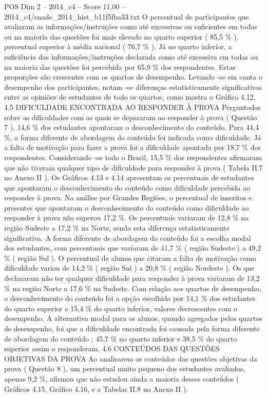 \begin{textsample}{POS Dim 2 – 2014\_c4 – Score 11.00 – 2014\_c4/enade\_2014\_hist\_b11f5fba33.txt}
O percentual de participantes que avaliaram as informações/instruções como até excessivas ou suficientes em todas ou na maioria das questões foi mais elevado no quarto superior ( 85,5 \% ), percentual superior à média nacional ( 76,7 \% ).
Já no quarto inferior, a suficiência das informações/instruções declarada como até excessiva em todas ou na maioria das questões foi percebida por 65,9 \% dos respondentes.
Estas proporções são crescentes com os quartos de desempenho.
Levando -se em conta o desempenho dos participantes, notam -se diferenças estatisticamente significativas entre as opiniões de estudantes de todo os quartos, como mostra o Gráfico 4.12. 4.5 DIFICULDADE ENCONTRADA AO RESPONDER À PROVA Perguntados sobre as dificuldades com as quais se depararam ao responder à prova ( Questão 7 ), 14,6 \% dos estudantes apontaram o desconhecimento do conteúdo.
Para 44,4 \%, a forma diferente de abordagem do conteúdo foi indicada como dificuldade.
Já a falta de motivação para fazer a prova foi a dificuldade apontada por 18,7 \% dos respondentes.
Considerando -se todo o Brasil, 15,5 \% dos respondentes afirmaram que não tiveram qualquer tipo de dificuldade para responder à prova ( Tabela II.7 no Anexo II ).
Os Gráficos 4.13 e 4.14 apresentam os percentuais de estudantes que apontaram o desconhecimento do conteúdo como dificuldade percebida ao responder à prova.
Na análise por Grandes Regiões, o percentual de inscritos e presentes que apontaram o desconhecimento do conteúdo como dificuldade ao responder à prova não superou 17,2 \%.
Os percentuais variaram de 12,8 \% na região Sudeste a 17,2 \% na Norte, sendo esta diferença estatisticamente significativa.
A forma diferente de abordagem do conteúdo foi a escolha modal dos estudantes, com percentuais que variaram de 41,7 \% ( região Sudeste ) a 49,2 \% ( região Sul ).
O percentual de alunos que citaram a falta de motivação como dificuldade variou de 14,2 \% ( região Sul ) a 20,8 \% ( região Nordeste ).
Os que declararam não ter qualquer dificuldade para responder à prova variaram de 13,2 \% na região Norte a 17,6 \% na Sudeste.
Com relação aos quartos de desempenho, o desconhecimento do conteúdo foi a opção escolhida por 14,1 \% dos estudantes do quarto superior e 15,4 \% do quarto inferior, valores decrescentes com o desempenho.
A alternativa modal para os alunos, quando agregados pelos quartos de desempenho, foi que a dificuldade encontrada foi causada pela forma diferente de abordagem do conteúdo : 45,7 \% no quarto inferior e 38,5 \% do quarto superior assim o responderam. 4.6 CONTEÚDOS DAS QUESTÕES OBJETIVAS DA PROVA Ao analisarem os conteúdos das questões objetivas da prova ( Questão 8 ), um percentual muito pequeno dos estudantes avaliados, apenas 9,2 \%, afirmou que não estudou ainda a maioria desses conteúdos ( Gráficos 4.15, Gráfico 4.16, e a Tabelas II.8 no Anexo II ).

\end{textsample}
